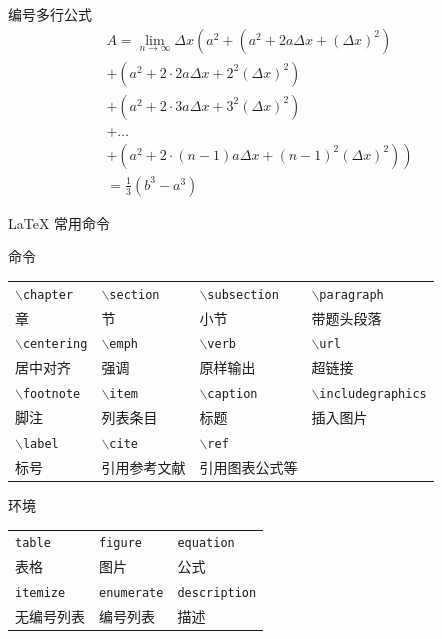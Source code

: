\documentclass[10pt,aspectratio=43]{beamer}
\def\cmd#1{\texttt{\color{red}\footnotesize $\backslash$#1}}
\def\env#1{\texttt{\color{blue}\footnotesize #1}}
\begin{document}
\begin{frame}
    \begin{exampleblock}{编号多行公式}
        \begin{multline}
            A=\lim_{n\rightarrow\infty}\Delta x\left(a^{2}+\left(a^{2}+2a\Delta x+\left(\Delta x\right)^{2}\right)\right.\label{eq:reset}\\
            +\left(a^{2}+2\cdot2a\Delta x+2^{2}\left(\Delta x\right)^{2}\right)\\
            +\left(a^{2}+2\cdot3a\Delta x+3^{2}\left(\Delta x\right)^{2}\right)\\
            +\ldots\\
            \left.+\left(a^{2}+2\cdot(n-1)a\Delta x+(n-1)^{2}\left(\Delta x\right)^{2}\right)\right)\\
            =\frac{1}{3}\left(b^{3}-a^{3}\right)
        \end{multline}
    \end{exampleblock}
\end{frame}


\begin{frame}[fragile]{\LaTeX{} 常用命令}
    \begin{exampleblock}{命令}
        \centering
        \footnotesize
        \begin{tabular}{llll}
            \cmd{chapter} & \cmd{section} & \cmd{subsection} & \cmd{paragraph} \\
            章 & 节 & 小节 & 带题头段落 \\\hline
            \cmd{centering} & \cmd{emph} & \cmd{verb} & \cmd{url} \\
            居中对齐 & 强调 & 原样输出 & 超链接 \\\hline
            \cmd{footnote} & \cmd{item} & \cmd{caption} & \cmd{includegraphics} \\
            脚注 & 列表条目 & 标题 & 插入图片 \\\hline
            \cmd{label} & \cmd{cite} & \cmd{ref} \\
            标号 & 引用参考文献 & 引用图表公式等\\\hline
        \end{tabular}
    \end{exampleblock}
    \begin{exampleblock}{环境}
        \centering
        \footnotesize
        \begin{tabular}{lll}
            \env{table} & \env{figure} & \env{equation}\\
            表格 & 图片 & 公式 \\\hline
            \env{itemize} & \env{enumerate} & \env{description}\\
            无编号列表 & 编号列表 & 描述 \\\hline
        \end{tabular}
    \end{exampleblock}
\end{frame}
\end{document}
